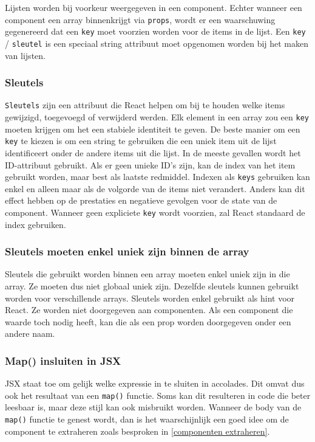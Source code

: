 Lijsten worden bij voorkeur weergegeven in een component. Echter wanneer een component een array binnenkrijgt via \texttt{props}, wordt er een waarschuwing gegenereerd dat een \texttt{key} moet voorzien worden voor de items in de lijst. Een \texttt{key} / \texttt{sleutel} is een speciaal string attribuut moet opgenomen worden bij het maken van lijsten.  \autocite{React2019h}

\subsubsection{Sleutels}

\texttt{Sleutels} zijn een attribuut die React helpen om bij te houden welke items gewijzigd, toegevoegd of verwijderd werden. Elk element in een array zou een \texttt{key} moeten krijgen om het een stabiele identiteit te geven. De beste manier om een \texttt{key} te kiezen is om een string te gebruiken die een uniek item uit de lijst identificeert onder de andere items uit die lijst. In de meeste gevallen wordt het ID-attribuut gebruikt. Als er geen unieke ID's zijn, kan de index van het item gebruikt worden, maar best als laatste redmiddel. Indexen als \texttt{keys} gebruiken kan enkel en alleen maar als de volgorde van de items niet verandert. Anders kan dit effect hebben op de prestaties en negatieve gevolgen voor de state van de component. Wanneer geen expliciete \texttt{key} wordt voorzien, zal React standaard de index gebruiken.  \autocite{React2019h}

\subsubsection{Sleutels moeten enkel uniek zijn binnen de array}

Sleutels die gebruikt worden binnen een array moeten enkel uniek zijn in die array. Ze moeten dus niet globaal uniek zijn. Dezelfde sleutels kunnen gebruikt worden voor verschillende arrays. Sleutels worden enkel gebruikt als hint voor React. Ze worden niet doorgegeven aan componenten. Als een component die waarde toch nodig heeft, kan die als een prop worden doorgegeven onder een andere naam. \autocite{React2019h}

\subsubsection{Map() insluiten in JSX}

JSX staat toe om gelijk welke expressie in te sluiten in accolades. Dit omvat dus ook het resultaat van een \texttt{map()} functie. Soms kan dit resulteren in code die beter leesbaar is, maar deze stijl kan ook misbruikt worden. Wanneer de body van de \texttt{map()} functie te genest wordt, dan is het waarschijnlijk een goed idee om de component te extraheren zoals besproken in \ref{componenten extraheren}. \autocite{React2019h}

